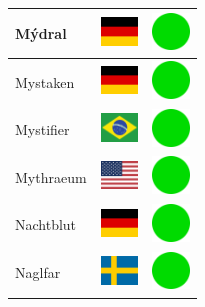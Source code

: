 \documentclass[12pt, a4paper, twoside]{report}
\begin{document}
\begin{center}
\begin{longtable}{|p{5cm}|p{2cm}|p{2cm}|}
 Mýdral                                                     & \includegraphics[width=1cm]{../img/flags/de} &   \includegraphics[width=1cm]{../likes/y} \\ \hline
 Mystaken                                                   & \includegraphics[width=1cm]{../img/flags/de} &   \includegraphics[width=1cm]{../likes/y} \\ \hline
 Mystifier                                                  & \includegraphics[width=1cm]{../img/flags/br} &   \includegraphics[width=1cm]{../likes/y} \\ \hline
 Mythraeum                                                  & \includegraphics[width=1cm]{../img/flags/us} &   \includegraphics[width=1cm]{../likes/y} \\ \hline
 Nachtblut                                                  & \includegraphics[width=1cm]{../img/flags/de} &   \includegraphics[width=1cm]{../likes/y} \\ \hline
 Naglfar                                                    & \includegraphics[width=1cm]{../img/flags/se} &   \includegraphics[width=1cm]{../likes/y} \\ \hline

\end{longtable}
\end{center}
\end{document}
